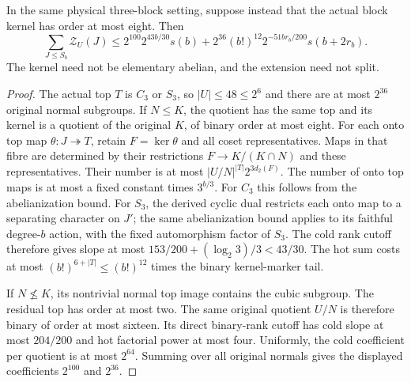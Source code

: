 \begin{proposition}
\label{prop:small-three-block-kernel-source}
In the same physical three-block setting, suppose instead that the
actual block kernel has order at most eight. Then
\[
 \sum_{J\leq S_b}\mathcal Z_U(J)
 \leq 2^{100}2^{43b/30}s(b)
       +2^{36}(b!)^{12}2^{-51br_b/200}s(b+2r_b).
\]
The kernel need not be elementary abelian, and the extension need not split.
\end{proposition}
\begin{proof}
The actual top $T$ is $C_3$ or $S_3$, so $|U|\leq48\leq2^6$
and there are at most $2^{36}$ original normal subgroups. If
$N\leq K$, the quotient has the same top and its kernel is a quotient
of the original $K$, of binary order at most eight. For each onto top
map $\theta:J\twoheadrightarrow T$, retain $F=\ker\theta$ and all
coset representatives. Maps in that fibre are determined by their
restrictions $F\to K/(K\cap N)$ and these representatives. Their
number is at most $|U/N|^{|T|}2^{3d_2(F)}$. The number of onto top
maps is at most a fixed constant times $3^{b/3}$. For $C_3$ this
follows from the abelianization bound. For $S_3$, the derived cyclic
dual restricts each onto map to a separating character on $J'$;
the same abelianization bound applies to its faithful degree-$b$
action, with the fixed automorphism factor of $S_3$.
The cold rank cutoff therefore gives slope at most
$153/200+(\log_2 3)/3<43/30$.
The hot sum costs at most $(b!)^{6+|T|}\leq(b!)^{12}$ times the
binary kernel-marker tail.

If $N\not\leq K$, its nontrivial normal top image contains the
cubic subgroup. The residual top has order at most two. The same
original quotient $U/N$ is therefore binary of order at most sixteen.
Its direct binary-rank cutoff has cold slope at most $204/200$ and
hot factorial power at most four. Uniformly, the cold coefficient
per quotient is at most $2^{64}$. Summing over all original normals
gives the displayed coefficients $2^{100}$ and $2^{36}$.
\end{proof}

